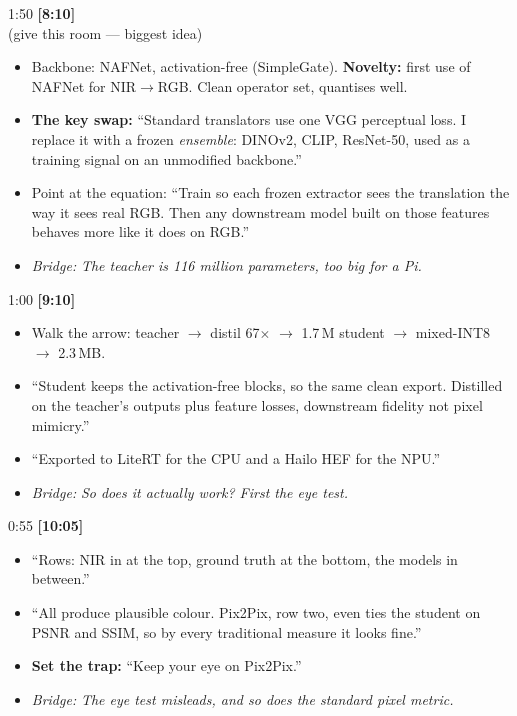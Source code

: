\documentclass[11pt]{article}
\newcommand{\slidehd}[3]{%
  \vspace{6pt}\noindent{\bfseries\textcolor{ICLBlue}{#1}}%
  \hfill{\small #2 \quad\textbf{[#3]}}\\[1pt]}
\newcommand{\bridge}[1]{\textit{\textcolor{ICLBlue}{Bridge:}} \textit{#1}}
\begin{document}
\slidehd{8. Core method: foundation-feature supervision}{1:50}{8:10} \textnormal{\small\textcolor{Hi}{(give this room --- biggest idea)}}
\begin{itemize}
	\item Backbone: NAFNet, activation-free (SimpleGate). \textcolor{Hi}{\textbf{Novelty:}} first use of NAFNet for NIR$\to$RGB. Clean operator set, quantises well.
	\item \textbf{The key swap:} ``Standard translators use one VGG perceptual loss. I replace it with a frozen \emph{ensemble}: DINOv2, CLIP, ResNet-50, used as a training signal on an unmodified backbone.''
	\item Point at the equation: ``Train so each frozen extractor sees the translation the way it sees real RGB. Then any downstream model built on those features behaves more like it does on RGB.''
	\item \bridge{The teacher is 116 million parameters, too big for a Pi.}
\end{itemize}

\slidehd{9. Making it deployable}{1:00}{9:10}
\begin{itemize}
	\item Walk the arrow: teacher $\to$ distil 67$\times$ $\to$ 1.7\,M student $\to$ mixed-INT8 $\to$ 2.3\,MB.
	\item ``Student keeps the activation-free blocks, so the same clean export. Distilled on the teacher's outputs plus feature losses, downstream fidelity not pixel mimicry.''
	\item ``Exported to LiteRT for the CPU and a Hailo HEF for the NPU.''
	\item \bridge{So does it actually work? First the eye test.}
\end{itemize}

\slidehd{10. Does it actually work? (qualitative)}{0:55}{10:05}
\begin{itemize}
	\item ``Rows: NIR in at the top, ground truth at the bottom, the models in between.''
	\item ``All produce plausible colour. Pix2Pix, row two, even ties the student on PSNR and SSIM, so by every traditional measure it looks fine.''
	\item \textcolor{Hi}{\textbf{Set the trap:}} ``Keep your eye on Pix2Pix.''
	\item \bridge{The eye test misleads, and so does the standard pixel metric.}
\end{itemize}
\end{document}
